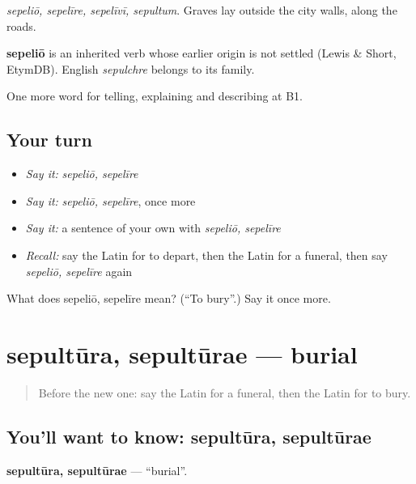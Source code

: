 \emph{sepeliō, sepelīre, sepelīvī, sepultum}. Graves lay outside the city walls, along the roads.

\begin{cousinweb}
\textbf{sepeliō} is an inherited verb whose earlier origin is not settled (Lewis \& Short, EtymDB). English \emph{sepulchre} belongs to its family.
\end{cousinweb}

\begin{grammarlens}[title={What you've built}]
One more word for telling, explaining and describing at B1.
\end{grammarlens}

\subsection*{Your turn}
\begin{itemize}
\raggedright
  \item \emph{Say it:} \emph{sepeliō, sepelīre}
  \item \emph{Say it:} \emph{sepeliō, sepelīre}, once more
  \item \emph{Say it:} a sentence of your own with \emph{sepeliō, sepelīre}
  \item \emph{Recall:} say the Latin for to depart, then the Latin for a funeral, then say \emph{sepeliō, sepelīre} again
\end{itemize}

\begin{tcolorbox}[breakable,colback=teal!4,colframe=teal!35!black,title={Before you move on}]
What does sepeliō, sepelīre mean? (\textquotedblleft{}To bury\textquotedblright{}.) Say it once more.
\end{tcolorbox}
\section[sepultūra, sepultūrae]{sepultūra, sepultūrae — burial}

\label{lesson:LA-C330-sepultura}



\begin{quote}
Before the new one: say the Latin for a funeral, then the Latin for to bury.
\end{quote}

\subsection*{You'll want to know: sepultūra, sepultūrae}
\textbf{sepultūra, sepultūrae} — \textquotedblleft{}burial\textquotedblright{}.

